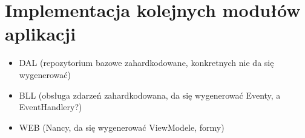\section{Implementacja kolejnych modułów aplikacji}

\begin{itemize}
 \item DAL (repozytorium bazowe zahardkodowane, konkretnych nie da się wygenerować)
 \item BLL (obsługa zdarzeń zahardkodowana, da się wygenerować Eventy, a EventHandlery?)
 \item WEB (Nancy, da się wygenerować ViewModele, formy)
\end{itemize}
